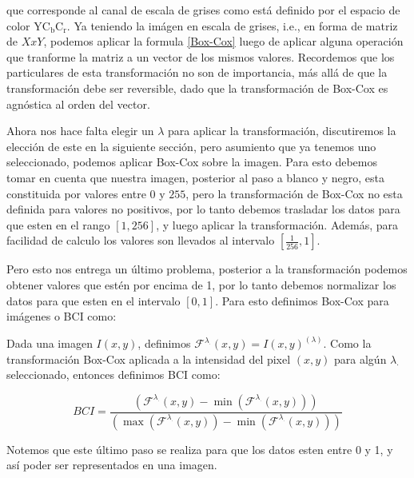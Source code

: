     que corresponde al canal de escala de grises como est\'a definido por el espacio de color $\mathrm{YC}_{\mathrm{b}} \mathrm{C}_{\mathrm{r}}$. Ya teniendo la im\'agen en escala de grises, i.e., en forma de matriz de $XxY$, podemos aplicar la formula \ref{Box-Cox} luego de aplicar alguna operaci\'on que tranforme la matriz a un vector de los mismos valores. Recordemos que los particulares de esta transformaci\'on no son de importancia, m\'as all\'a de que la transformaci\'on debe ser reversible, dado que la transformaci\'on de Box-Cox es agn\'ostica al orden del vector.

    Ahora nos hace falta elegir un $\lambda$ para aplicar la transformaci\'on, discutiremos la elecci\'on de este en la siguiente secci\'on, pero asumiento que ya tenemos uno seleccionado, podemos aplicar Box-Cox sobre la imagen. Para esto debemos tomar en cuenta que nuestra imagen, posterior al paso a blanco y negro, esta constituida por valores entre $0$ y $255$, pero la transformaci\'on de Box-Cox no esta definida para valores no positivos, por lo tanto debemos trasladar los datos para que esten en el rango $[1,256]$, y luego aplicar la transformaci\'on. Adem\'as, para facilidad de calculo los valores son llevados al intervalo $[\frac{1}{256},1]$.

    Pero esto nos entrega un \'ultimo problema, posterior a la transformaci\'on podemos obtener valores que est\'en por encima de 1, por lo tanto debemos normalizar los datos para que esten en el intervalo $[0,1]$. Para esto definimos Box-Cox para im\'agenes o BCI como:

    \begin{defn}

        Dada una imagen $I(x, y)$, definimos $\mathcal{F}^{\lambda_{\cdot}}(x, y) = I(x, y)^{(\lambda)}$. Como la transformación Box-Cox aplicada a la intensidad del pixel $(x, y)$ para alg\'un $\lambda_\cdot$ seleccionado, entonces definimos BCI como:

    \begin{equation}
        BCI = \frac{\left(\mathcal{F}^{\lambda_{\cdot}}(x, y) - \min\left(\mathcal{F}^{\lambda_{\cdot}}(x, y)\right)\right)}{\left(\max\left(\mathcal{F}^{\lambda_{\cdot}}(x, y)\right) - \min\left(\mathcal{F}^{\lambda_{\cdot}}(x, y)\right)\right)}
    \end{equation}
        
        
    \end{defn}

    Notemos que este \'ultimo paso se realiza para que los datos esten entre 0 y 1, y as\'i poder ser representados en una imagen.
    
